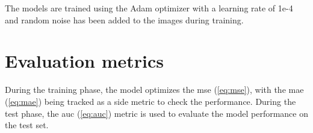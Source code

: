         The models are trained using the Adam optimizer \cite{kingma2014adam} with a learning rate of 1e-4 and random noise has been added to the images during training.
    
    
    

\section{Evaluation metrics}
    During the training phase, the model optimizes the \acrfull{mse} (\autoref{eq:mse}), with the \acrfull{mae} (\autoref{eq:mae}) being tracked as a side metric to check the performance. During the test phase, the \acrfull{auc} (\autoref{eq:auc}) metric is used to evaluate the model performance on the test set.
    

